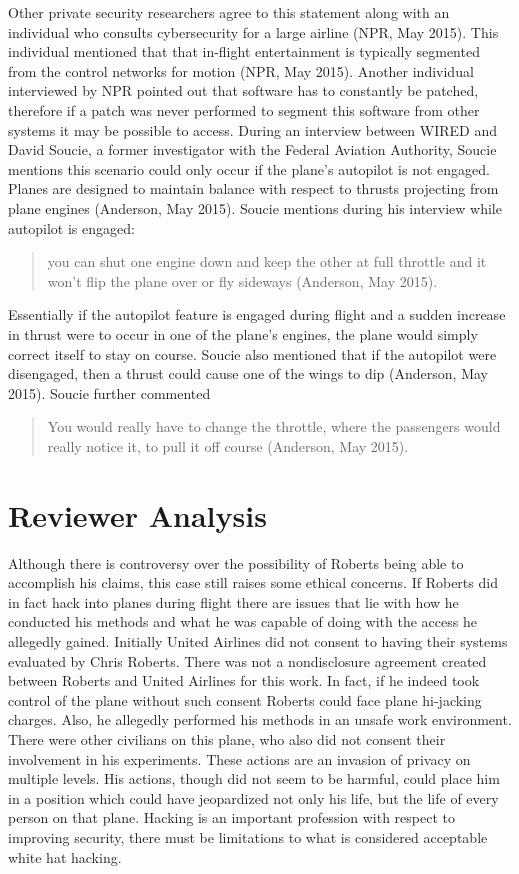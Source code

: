 \documentclass[notitlepage,a4paper,12pt]{article}
\begin{document}
Other private security researchers agree to this statement along with an individual who consults cybersecurity for a large airline (NPR, May 2015). This individual mentioned that that in-flight entertainment is typically segmented from the control networks for motion (NPR, May 2015). Another individual interviewed by NPR pointed out that software has to constantly be patched, therefore if a patch was never performed to segment this software from other systems it may be possible to access. During an interview between WIRED and David Soucie, a former investigator with the Federal Aviation Authority, Soucie mentions this scenario could only occur if the plane’s autopilot is not engaged. Planes are designed to maintain balance with respect to thrusts projecting from plane engines (Anderson, May 2015). Soucie mentions during his interview while autopilot is engaged: 

\begin{quote}
	you can shut one engine down and keep the other at full throttle and it won’t flip the plane over or fly sideways (Anderson, May 2015).
\end{quote}

 Essentially if the 
autopilot feature is engaged during flight and a sudden increase in thrust were to occur in one of the plane’s engines, the plane would simply correct itself to stay on course. Soucie also mentioned that if the autopilot were disengaged, then a thrust could cause one of the wings to dip (Anderson, May 2015). Soucie further commented

\begin{quote}
	You would really have to change the throttle, where the passengers would really notice it, to pull it off course (Anderson, May 2015).
\end{quote}


\section*{Reviewer Analysis}
Although there is controversy over the possibility of Roberts being able to accomplish his claims, this case still raises some ethical concerns. If Roberts did in fact hack into planes during flight there are issues that lie with how he conducted his methods and what he was capable of doing with the access he allegedly gained. Initially United Airlines did not consent to having their systems evaluated by Chris Roberts. There was not a nondisclosure agreement created between Roberts and United Airlines for this work. In fact, if he indeed took control of the plane without such consent Roberts could face plane hi-jacking charges. Also, he allegedly performed his methods in an unsafe work environment. There were other civilians on this plane, who also did not consent their involvement in his experiments. These actions are an invasion of privacy on multiple levels. His actions, though did not seem to be harmful, could place him in a position which could have jeopardized not only his life, but the life of every person on that plane. Hacking is an important profession with respect to improving security, there must be limitations to what is considered acceptable white hat hacking. 
\end{document}

